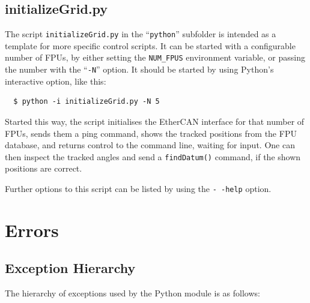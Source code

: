 \documentclass[fontsize=12,a4paper]{scrreprt}
\begin{document}
\section{initializeGrid.py}
\label{sec:initializegrid}

The script \texttt{initializeGrid.py} in the ``\texttt{python}''
subfolder is intended as a template for more specific control scripts.
It can be started with a configurable number of FPUs, by either
setting the \texttt{NUM\_FPUS} environment variable, or passing the
number with the ``\texttt{-N}'' option. It should be started by using
Python's interactive option, like this:

\begin{verbatim}
  $ python -i initializeGrid.py -N 5
\end{verbatim}

Started this way, the script initialises the EtherCAN interface for that number of
FPUs, sends them a ping command, shows the tracked positions from the
FPU database, and returns control to the command line, waiting for
input. One can then inspect the tracked angles and send a
\texttt{findDatum()} command, if the shown positions are correct.

Further options to this script can be listed by using the
\texttt{-\,-help} option.


\chapter{Errors}
\label{sec:errors}

\section{Exception Hierarchy}
\label{sec:ExceptionsReference}
The hierarchy of exceptions used by the Python module is as follows:
\end{document}
